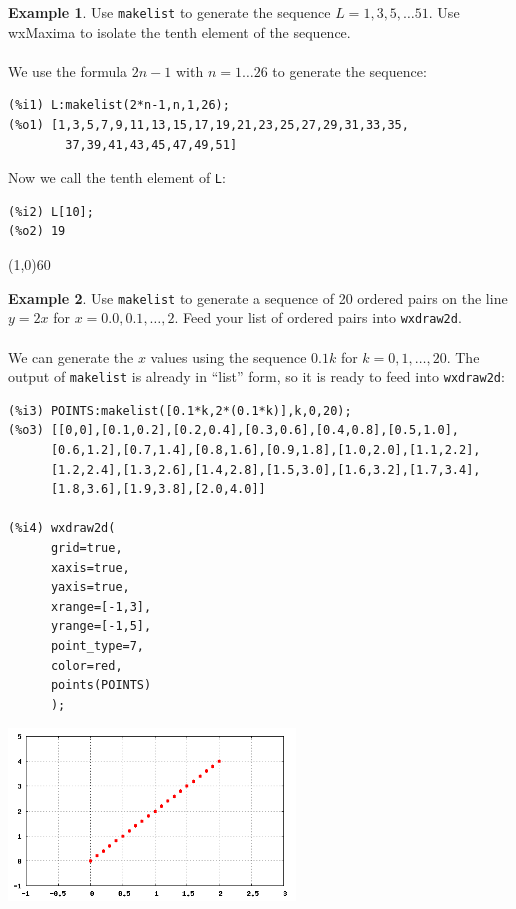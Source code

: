 \documentclass[10.5pt,twoside]{report}
\theoremstyle{definition}
\newtheorem{exmp}{Example}[section]
\begin{document}
\begin{exmp} Use \verb|makelist| to generate the sequence $L=1,3,5,\dots 51$. Use wxMaxima to isolate the tenth element of the sequence. \\
${}$\\

We use the formula $2n-1$ with $n=1\dots 26$ to generate the sequence:

\begin{verbatim}
(%i1) L:makelist(2*n-1,n,1,26);
(%o1) [1,3,5,7,9,11,13,15,17,19,21,23,25,27,29,31,33,35,
        37,39,41,43,45,47,49,51]
\end{verbatim}

Now we call the tenth element of \verb|L|:

\begin{verbatim}
(%i2) L[10];
(%o2) 19
\end{verbatim}

\end{exmp}

\line(1,0){60}
\linethickness{0.5mm}


\begin{exmp} Use \verb|makelist| to generate a sequence of 20 ordered pairs on the line $y=2x$ for $x=0.0,0.1,\dots ,2$.  Feed your list of ordered pairs into \verb|wxdraw2d|. \\
${}$\\

We can generate the $x$ values using the sequence $0.1k$ for $k=0,1,\dots ,20$.  The output of \verb|makelist| is already in ``list'' form, so it is ready to feed into \verb|wxdraw2d|:

\begin{verbatim}
(%i3) POINTS:makelist([0.1*k,2*(0.1*k)],k,0,20);
(%o3) [[0,0],[0.1,0.2],[0.2,0.4],[0.3,0.6],[0.4,0.8],[0.5,1.0],
      [0.6,1.2],[0.7,1.4],[0.8,1.6],[0.9,1.8],[1.0,2.0],[1.1,2.2],
      [1.2,2.4],[1.3,2.6],[1.4,2.8],[1.5,3.0],[1.6,3.2],[1.7,3.4],
      [1.8,3.6],[1.9,3.8],[2.0,4.0]]

(%i4) wxdraw2d(
      grid=true,
      xaxis=true,
      yaxis=true,
      xrange=[-1,3],
      yrange=[-1,5],
      point_type=7,
      color=red,
      points(POINTS)
      );
\end{verbatim}

\includegraphics[width=3in]{example_0_5_2_1}

\end{exmp}
\end{document}
